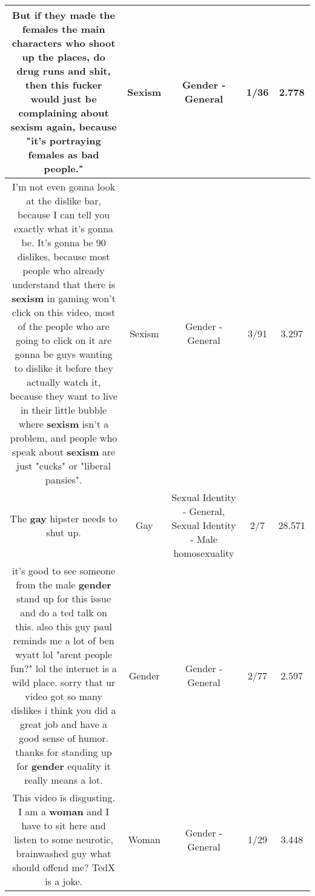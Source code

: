 \documentclass[11pt]{article}
\newlength\mylength
\begin{document}
\begin{center}
\begin{longtable}{|C{.65\mylength}|C{.30\mylength}|C{.12\mylength}|C{.12\mylength}|C{.12\mylength}|}
  \small But if they made the females the main characters who shoot up the places, do drug runs and shit, then this fucker would just be complaining about \textbf{sexism} again, because "it's portraying females as bad people."\normalsize   & Sexism & Gender - General & 1/36 & 2.778 \\  \hline
  \small I'm not even gonna look at the dislike bar, because I can tell you exactly what it's gonna be. It's gonna be 90 dislikes, because most people who already understand that there is \textbf{sexism} in gaming won't click on this video, most of the people who are going to click on it are gonna be guys wanting to dislike it before they actually watch it, because they want to live in their little bubble where \textbf{sexism} isn't a problem, and people who speak about \textbf{sexism} are just "cucks" or "liberal pansies".\normalsize   & Sexism & Gender - General & 3/91 & 3.297 \\  \hline
  \small The \textbf{g\textbf{ay}} hipster needs to shut up.\normalsize   & Gay & Sexual Identity - General, Sexual Identity - Male homosexuality & 2/7 & 28.571 \\  \hline
  \small it's good to see someone from the male \textbf{gender} stand up for this issue and do a ted talk on this. also this guy paul reminds me a lot of ben wyatt lol "arent people fun?" lol the internet is a wild place. sorry that ur video got so many dislikes i think you did a great job and have a good sense of humor. thanks for standing up for \textbf{gender} equality it really means a lot.\normalsize   & Gender & Gender - General & 2/77 & 2.597 \\  \hline
  \small This video is disgusting. I am a \textbf{woman} and I have to sit here and listen to some neurotic, brainwashed guy what should offend me? TedX is a joke.\normalsize   & Woman & Gender - General & 1/29 & 3.448 \\  \hline

\end{longtable}
\end{center}
\end{document}
